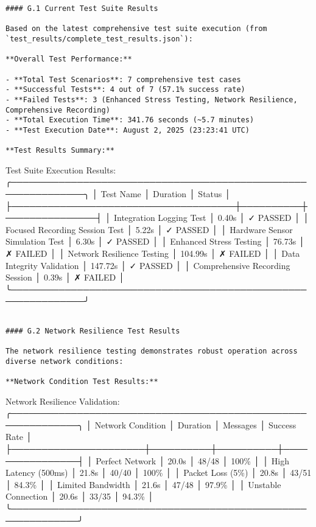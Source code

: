 \documentclass[12pt,a4paper]{article}
\begin{document}
{{\begin{verbatim}
#### G.1 Current Test Suite Results

Based on the latest comprehensive test suite execution (from `test_results/complete_test_results.json`):

**Overall Test Performance:**

- **Total Test Scenarios**: 7 comprehensive test cases
- **Successful Tests**: 4 out of 7 (57.1% success rate)
- **Failed Tests**: 3 (Enhanced Stress Testing, Network Resilience, Comprehensive Recording)
- **Total Execution Time**: 341.76 seconds (~5.7 minutes)
- **Test Execution Date**: August 2, 2025 (23:23:41 UTC)

**Test Results Summary:**

\end{verbatim}
Test Suite Execution Results:
╭──────────────────────────────────────────────────────────────╮
│ Test Name                           │ Duration │ Status        │
├─────────────────────────────────────┼──────────┼───────────────┤
│ Integration Logging Test            │ 0.40s    │ ✓ PASSED     │
│ Focused Recording Session Test      │ 5.22s    │ ✓ PASSED     │
│ Hardware Sensor Simulation Test    │ 6.30s    │ ✓ PASSED     │
│ Enhanced Stress Testing             │ 76.73s   │ ✗ FAILED     │
│ Network Resilience Testing          │ 104.99s  │ ✗ FAILED     │
│ Data Integrity Validation          │ 147.72s  │ ✓ PASSED     │
│ Comprehensive Recording Session     │ 0.39s    │ ✗ FAILED     │
╰──────────────────────────────────────────────────────────────╯
\begin{verbatim}

#### G.2 Network Resilience Test Results

The network resilience testing demonstrates robust operation across diverse network conditions:

**Network Condition Test Results:**

\end{verbatim}
Network Resilience Validation:
╭─────────────────────────────────────────────────────────────╮
│ Network Condition    │ Duration │ Messages │ Success Rate   │
├──────────────────────┼──────────┼──────────┼────────────────┤
│ Perfect Network      │ 20.0s    │ 48/48    │ 100\%          │
│ High Latency (500ms) │ 21.8s    │ 40/40    │ 100\%          │
│ Packet Loss (5\%)     │ 20.8s    │ 43/51    │ 84.3\%         │
│ Limited Bandwidth    │ 21.6s    │ 47/48    │ 97.9\%         │
│ Unstable Connection  │ 20.6s    │ 33/35    │ 94.3\%         │
╰─────────────────────────────────────────────────────────────╯
\begin{verbatim}


\end{verbatim}}}
\end{document}
